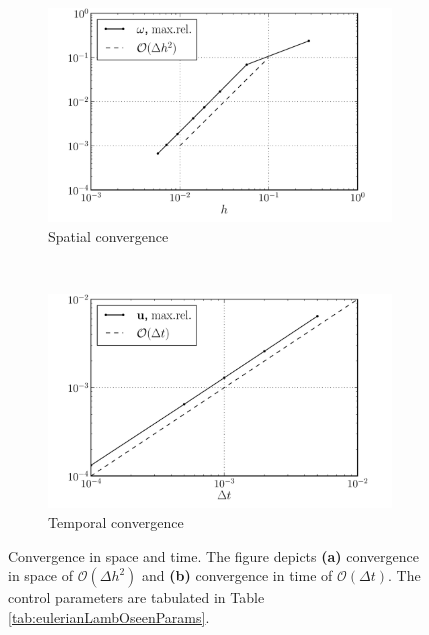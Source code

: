 	\begin{figure}[p]
        \centering
        \begin{subfigure}[b]{0.5\textwidth}
                \includegraphics[width=\textwidth]{figures/eulerian/lambOseen_eulerianConvergence_dx_compressed.pdf}
                \caption{Spatial convergence}
                \label{fig:lambOseen_eulerianConvergence_dx}
        \end{subfigure}%
        ~ %
        \begin{subfigure}[b]{0.5\textwidth}
                \includegraphics[width=\textwidth]{figures/eulerian/lambOseen_eulerianConvergence_dt_compressed.pdf}
                \caption{Temporal convergence}
                \label{fig:lambOseen_eulerianConvergence_dt}
        \end{subfigure}
        \caption{Convergence in space and time. The figure depicts \textbf{(a)} convergence in space of $\mathcal{O}(\Delta h^2)$ and \textbf{(b)} convergence in time of $\mathcal{O}(\Delta t)$. The control parameters are tabulated in Table \ref{tab:eulerianLambOseenParams}.}
        \label{fig:lambOseen_eulerianConvergence}
	\end{figure}		
	

